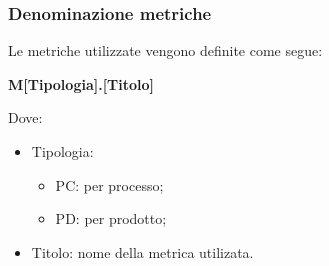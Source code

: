 \subsubsection{Denominazione metriche}

Le metriche utilizzate vengono definite come segue:

\begin{center}
    \large{\textbf{M[Tipologia].[Titolo]}}
\end{center}

Dove:
    \begin{itemize}
        \item Tipologia: \begin{itemize}
            \item PC: per processo;
            \item PD: per prodotto;
        \end{itemize}
        \item Titolo: nome della metrica utilizata.
    \end{itemize}

